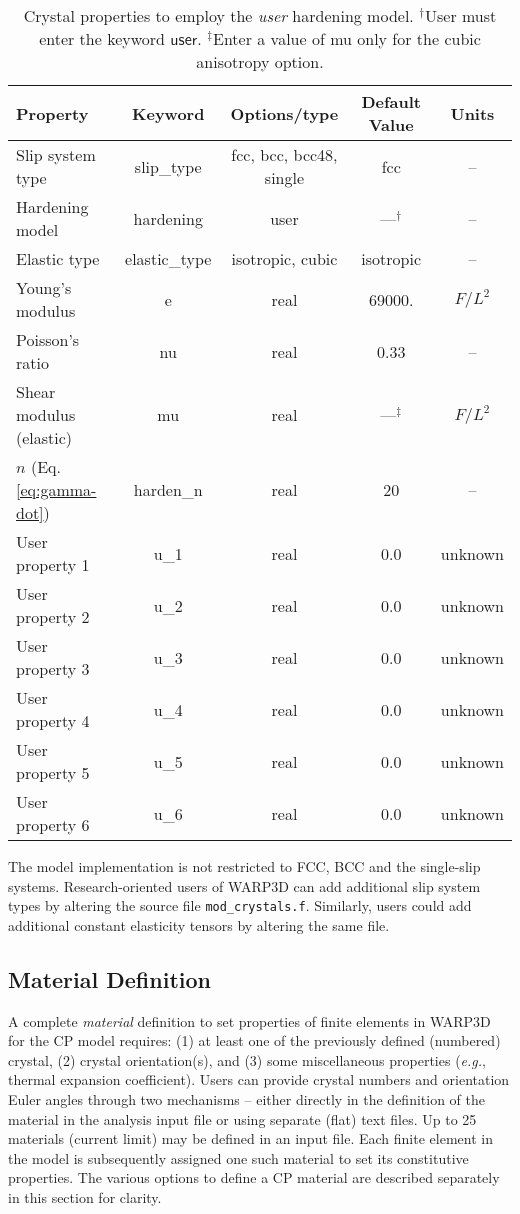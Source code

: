 \documentclass[11pt]{report}
\numberwithin{equation}{section}
\newcommand{\hv} {\mathsf}   %
\newcommand{\eg}{\emph{e.g.},\xspace}
\newcommand{\ti}{\emph}
\begin{document}
\begin{table}[htb]
\small
\centering
\setlength{\extrarowheight}{3pt}

\begin{tabular}{|l|c|c|c|c|}
\hline 
\textbf{Property} & \textbf{Keyword} & \textbf{Options/type}&\textbf{Default Value}&\textbf{Units}\tabularnewline
\hline \hline
Slip system type & slip\_type & fcc, bcc, bcc48, single&fcc&--\tabularnewline \hline
Hardening model & hardening &user&---$^\dag$&--\tabularnewline \hline
Elastic type & elastic\_type & isotropic, cubic&isotropic&--\tabularnewline \hline
Young's modulus & e & real&69000.&$F/L^2$\tabularnewline \hline
Poisson's ratio & nu & real&0.33&--\tabularnewline \hline
Shear modulus (elastic) & mu & real&---$^\ddag$&$F/L^2$\tabularnewline \hline
$n$ (Eq. \ref{eq:gamma-dot}) & harden\_n & real&20&--\tabularnewline \hline
User property 1 & u\_1 & real&0.0&unknown\tabularnewline \hline
User property 2 & u\_2 & real&0.0&unknown\tabularnewline \hline
User property 3 & u\_3 & real&0.0&unknown\tabularnewline \hline
User property 4 & u\_4 & real&0.0&unknown\tabularnewline \hline
User property 5 & u\_5 & real&0.0&unknown\tabularnewline \hline
User property 6 & u\_6 & real&0.0&unknown\tabularnewline \hline
\end{tabular}
\caption{Crystal properties to employ the \ti{user}  hardening model. $^\dag$User must
enter the keyword $\hv{user}$.
$^\ddag$Enter a value of  mu only
for the cubic anisotropy option.
 \label{tab:crys-user}}
\normalsize
\end{table}


The model implementation is not restricted to FCC, BCC and the single-slip systems.
Research-oriented users of WARP3D can add additional slip system 
types by altering the source file
\verb|mod_crystals.f|. Similarly, users could add additional constant elasticity
tensors by altering the same file.

\subsection{Material Definition}

A complete \ti{material} definition to set properties of finite elements
in WARP3D for the CP model requires:
(1) at least one of the previously defined (numbered) crystal, (2) crystal orientation(s),
and (3) some miscellaneous properties (\eg thermal expansion coefficient).  
Users can provide crystal numbers and orientation Euler angles through two mechanisms -- either 
directly in the definition of the material in the analysis input file 
or using separate (flat) text files. Up to 25 materials (current limit) may be defined in an
input file. Each finite element in the model is subsequently assigned one such material to
set its constitutive properties. The various options to define a CP material are described separately in this
section for clarity.
\end{document}
